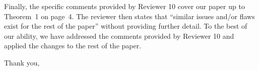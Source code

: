 \begin{flushleft}
    Finally, the specific comments provided by Reviewer 10 cover our paper up to Theorem~1 on page~4. The reviewer then states that ``similar issues and/or flaws exist for the rest of the paper'' without providing further detail. To the best of our ability, we have addressed the comments provided by Reviewer 10 and applied the changes to the rest of the paper.

    Thank you,\\[1em]%
    \theauthor
\end{flushleft}
\newpage